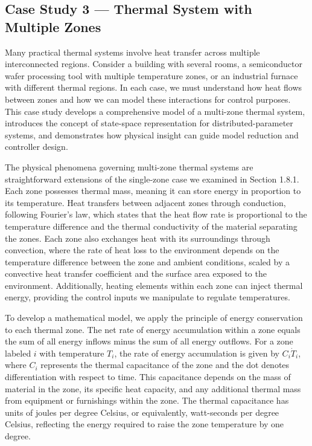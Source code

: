 \subsection{Case Study 3 --- Thermal System with Multiple Zones}

Many practical thermal systems involve heat transfer across multiple interconnected regions. Consider a building with several rooms, a semiconductor wafer processing tool with multiple temperature zones, or an industrial furnace with different thermal regions. In each case, we must understand how heat flows between zones and how we can model these interactions for control purposes. This case study develops a comprehensive model of a multi-zone thermal system, introduces the concept of state-space representation for distributed-parameter systems, and demonstrates how physical insight can guide model reduction and controller design.

The physical phenomena governing multi-zone thermal systems are straightforward extensions of the single-zone case we examined in Section 1.8.1. Each zone possesses thermal mass, meaning it can store energy in proportion to its temperature. Heat transfers between adjacent zones through conduction, following Fourier's law, which states that the heat flow rate is proportional to the temperature difference and the thermal conductivity of the material separating the zones. Each zone also exchanges heat with its surroundings through convection, where the rate of heat loss to the environment depends on the temperature difference between the zone and ambient conditions, scaled by a convective heat transfer coefficient and the surface area exposed to the environment. Additionally, heating elements within each zone can inject thermal energy, providing the control inputs we manipulate to regulate temperatures.

To develop a mathematical model, we apply the principle of energy conservation to each thermal zone. The net rate of energy accumulation within a zone equals the sum of all energy inflows minus the sum of all energy outflows. For a zone labeled $i$ with temperature $T_i$, the rate of energy accumulation is given by $C_i \dot{T}_i$, where $C_i$ represents the thermal capacitance of the zone and the dot denotes differentiation with respect to time. This capacitance depends on the mass of material in the zone, its specific heat capacity, and any additional thermal mass from equipment or furnishings within the zone. The thermal capacitance has units of joules per degree Celsius, or equivalently, watt-seconds per degree Celsius, reflecting the energy required to raise the zone temperature by one degree.

